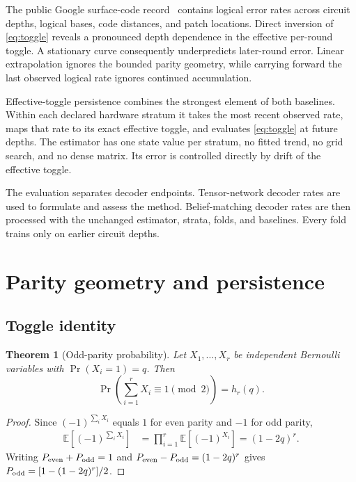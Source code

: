 \documentclass[10pt,letterpaper,twoside]{article}
\newtheorem{theorem}{Theorem}
\begin{document}
The public Google surface-code record~\cite{google2023suppressing} contains
logical error rates across circuit depths, logical bases, code distances, and
patch locations. Direct inversion of \eqref{eq:toggle} reveals a pronounced
depth dependence in the effective per-round toggle. A stationary curve
consequently underpredicts later-round error. Linear extrapolation ignores the
bounded parity geometry, while carrying forward the last observed logical rate
ignores continued accumulation.

Effective-toggle persistence combines the strongest element of both baselines.
Within each declared hardware stratum it takes the most recent observed rate,
maps that rate to its exact effective toggle, and evaluates
\eqref{eq:toggle} at future depths. The estimator has one state value per
stratum, no fitted trend, no grid search, and no dense matrix. Its error is
controlled directly by drift of the effective toggle.

The evaluation separates decoder endpoints. Tensor-network decoder rates are
used to formulate and assess the method. Belief-matching decoder rates are
then processed with the unchanged estimator, strata, folds, and baselines.
Every fold trains only on earlier circuit depths.

\section{Parity geometry and persistence}

\subsection{Toggle identity}

\begin{theorem}[Odd-parity probability]
\label{thm:parity}
Let $X_1,\ldots,X_r$ be independent Bernoulli variables with
$\Pr(X_i=1)=q$. Then
\begin{equation}
 \Pr\!\left(\sum_{i=1}^r X_i\equiv1\pmod 2\right)=h_r(q).
 \label{eq:odd}
\end{equation}
\end{theorem}

\begin{proof}
Since $(-1)^{\sum_iX_i}$ equals $1$ for even parity and $-1$ for odd parity,
\begin{align}
 \mathbb E\!\left[(-1)^{\sum_iX_i}\right]
 &=\prod_{i=1}^r\mathbb E[(-1)^{X_i}]
 =(1-2q)^r.
\end{align}
Writing $P_{\rm even}+P_{\rm odd}=1$ and
$P_{\rm even}-P_{\rm odd}=(1-2q)^r$ gives
$P_{\rm odd}=[1-(1-2q)^r]/2$.
\end{proof}
\end{document}
